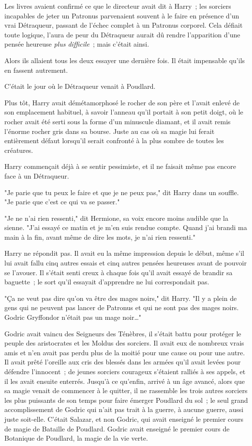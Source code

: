 Les livres avaient confirmé ce que le directeur avait dit à Harry~; les sorciers incapables de jeter un Patronus parvenaient souvent à le faire en présence d'un vrai Détraqueur, passant de l'échec complet à un Patronus corporel. Cela défiait toute logique, l'aura de peur du Détraqueur aurait dû rendre l'apparition d'une pensée heureuse \emph{plus difficile}~; mais c'était ainsi.

Alors ils allaient tous les deux essayer une dernière fois. Il était impensable qu'ils en fassent autrement.

C'était le jour où le Détraqueur venait à Poudlard.

Plus tôt, Harry avait démétamorphosé le rocher de son père et l'avait enlevé de son emplacement habituel, à savoir l'anneau qu'il portait à son petit doigt, où le rocher avait été serti sous la forme d'un minuscule diamant, et il avait remis l'énorme rocher gris dans sa bourse. Juste au cas où sa magie lui ferait entièrement défaut lorsqu'il serait confronté à la plus sombre de toutes les créatures.

Harry commençait déjà à se sentir pessimiste, et il ne faisait même pas encore face à un Détraqueur.

"Je parie que tu peux le faire et que je ne peux pas," dit Harry dans un souffle. "Je parie que c'est ce qui va se passer."

"Je ne n'ai rien ressenti," dit Hermione, sa voix encore moins audible que la sienne. "J'ai essayé ce matin et je m'en suis rendue compte. Quand j'ai brandi ma main à la fin, avant même de dire les mots, je n'ai rien ressenti."

Harry ne répondit pas. Il avait eu la même impression depuis le début, même s'il lui avait fallu cinq autres essais et cinq autres pensées heureuses avant de pouvoir se l'avouer. Il s'était senti creux à chaque fois qu'il avait essayé de brandir sa baguette~; le sort qu'il essayait d'apprendre ne lui correspondait pas.

"Ça ne veut pas dire qu'on va être des mages noirs," dit Harry. "Il y a plein de gens qui ne peuvent pas lancer de Patronus et qui ne sont pas des mages noirs. Godric Gryffondor n'était pas un mage noir…"

Godric avait vaincu des Seigneurs des Ténèbres, il s'était battu pour protéger le peuple des aristocrates et les Moldus des sorciers. Il avait eux de nombreux vrais amis et n'en avait pas perdu plus de la moitié pour une cause ou pour une autre. Il avait prêté l'oreille aux cris des blessés dans les armées qu'il avait levées pour défendre l'innocent~; de jeunes sorciers courageux s'étaient ralliés à ses appels, et il les avait ensuite enterrés. Jusqu'à ce qu'enfin, arrivé à un âge avancé, alors que sa magie venait de commencer à le quitter, il ne rassemble les trois autres sorciers les plus puissants de son temps pour faire émerger Poudlard du sol~; le seul grand accomplissement de Godric qui n'ait pas trait à la guerre, à aucune guerre, aussi juste soit-elle. C'était Salazar, et non Godric, qui avait enseigné le premier cours de magie de Bataille de Poudlard. Godric avait enseigné le premier cours de Botanique de Poudlard, la magie de la vie verte.

